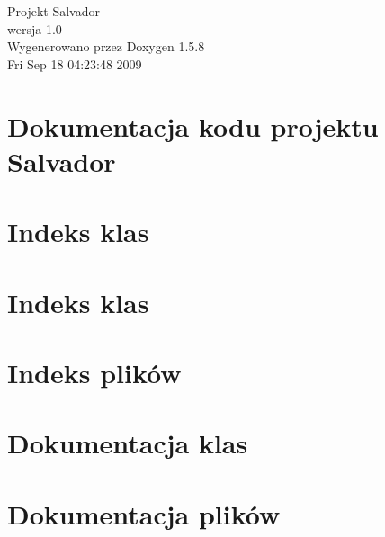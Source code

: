 \documentclass[a4paper]{book}
\begin{document}
\begin{titlepage}
\vspace*{7cm}
\begin{center}
{\Large Projekt Salvador \\[1ex]\large wersja 1.0 }\\
\vspace*{1cm}
{\large Wygenerowano przez Doxygen 1.5.8}\\
\vspace*{0.5cm}
{\small Fri Sep 18 04:23:48 2009}\\
\end{center}
\end{titlepage}
\clearemptydoublepage
{}
\tableofcontents
\clearemptydoublepage
{}
\chapter{Dokumentacja kodu projektu Salvador}
\label{index}\hypertarget{index}{}
\chapter{Indeks klas}

\chapter{Indeks klas}

\chapter{Indeks plików}

\chapter{Dokumentacja klas}











\chapter{Dokumentacja plików}

























\printindex
\end{document}
